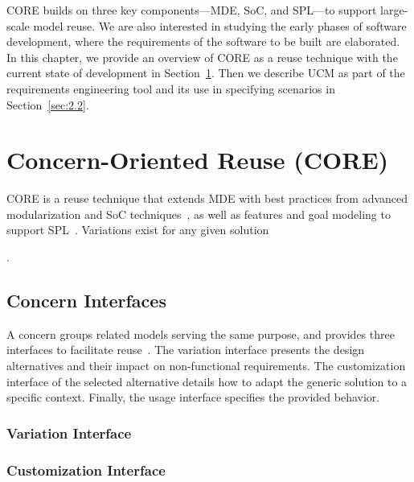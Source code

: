 CORE builds on three key components---MDE, SoC, and SPL---to support large-scale model reuse. We are also interested in studying the early phases of software development, where the requirements of the software to be built are elaborated. In this chapter, we provide an overview of CORE as a reuse technique with the current state of development in Section~\ref{sec:2.1}. Then we describe UCM as part of the requirements engineering tool and its use in specifying scenarios in Section~\ref{sec:2.2}.

\section{Concern-Oriented Reuse (CORE)} \label{sec:2.1}

CORE is a reuse technique that extends MDE with best practices from advanced modularization and SoC techniques~\cite{dijkstra1976discipline}, as well as features and goal modeling to support SPL~\cite{pohl2005software}. Variations exist for any given solution 

.

\subsection{Concern Interfaces}

A concern groups related models serving the same purpose, and provides three interfaces to facilitate reuse~\cite{alam2013concern}. The variation interface presents the design alternatives and their impact on non-functional requirements. The customization interface of the selected alternative details how to adapt the generic solution to a specific context. Finally, the usage interface specifies the provided behavior.

\subsubsection{Variation Interface}

\subsubsection{Customization Interface}

